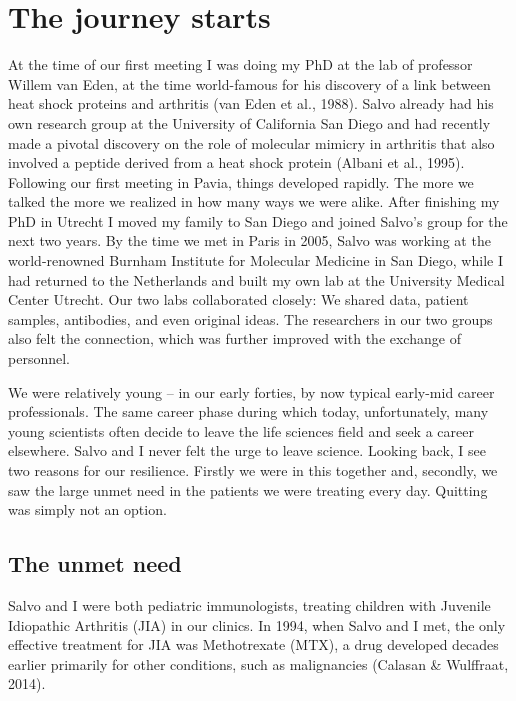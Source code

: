 \documentclass[authordate, editorial, issue]{jote-new-article}
\begin{document}
	\section{The journey starts}



	At the time of our first meeting I was doing my PhD at the lab of professor Willem van Eden, at the time world-famous for his discovery of a link between heat shock proteins and arthritis (van Eden et al., 1988). Salvo already had his own research group at the University of California San Diego and had recently made a pivotal discovery on the role of molecular mimicry in arthritis that also involved a peptide derived from a heat shock protein (Albani et al., 1995). Following our first meeting in Pavia, things developed rapidly. The more we talked the more we realized in how many ways we were alike. After finishing my PhD in Utrecht I moved my family to San Diego and joined Salvo's group for the next two years. By the time we met in Paris in 2005, Salvo was working at the world-renowned Burnham Institute for Molecular Medicine in San Diego, while I had returned to the Netherlands and built my own lab at the University Medical Center Utrecht. Our two labs collaborated closely: We shared data, patient samples, antibodies, and even original ideas. The researchers in our two groups also felt the connection, which was further improved with the exchange of personnel.







	We were relatively young -- in our early forties, by now typical early-mid career professionals. The same career phase during which today, unfortunately, many young scientists often decide to leave the life sciences field and seek a career elsewhere. Salvo and I never felt the urge to leave science. Looking back, I see two reasons for our resilience. Firstly we were in this together and, secondly, we saw the large unmet need in the patients we were treating every day. Quitting was simply not an option.







	\subsection{The unmet need}



	Salvo and I were both pediatric immunologists, treating children with Juvenile Idiopathic Arthritis (JIA) in our clinics. In 1994, when Salvo and I met, the only effective treatment for JIA was Methotrexate (MTX), a drug developed decades earlier primarily for other conditions, such as malignancies (Calasan \& Wulffraat, 2014).
\end{document}
